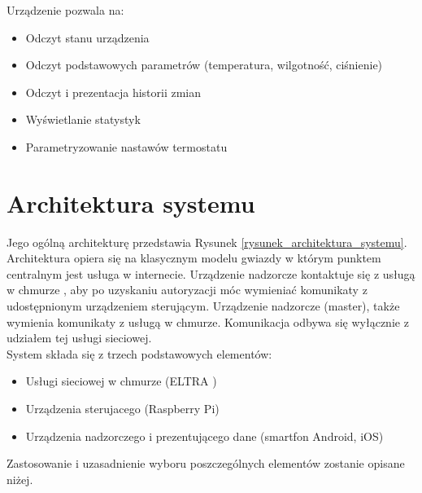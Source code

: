 \documentclass[a4paper,10pt]{article}
\begin{document}
Urządzenie pozwala na:

\begin{itemize}
    \item Odczyt stanu urządzenia
    \item Odczyt podstawowych parametrów (temperatura, wilgotność, ciśnienie)
    \item Odczyt i prezentacja historii zmian
    \item Wyświetlanie statystyk
    \item Parametryzowanie nastawów termostatu
\end{itemize}

\section{Architektura systemu}
\label{architektura_systemu}

Jego ogólną architekturę przedstawia Rysunek \ref{rysunek_architektura_systemu}. Architektura opiera się na klasycznym modelu gwiazdy w którym punktem centralnym jest usługa w internecie. Urządzenie nadzorcze kontaktuje się z usługą w chmurze \cite{CloudExplained}, aby po uzyskaniu autoryzacji móc wymieniać komunikaty z udostępnionym urządzeniem sterującym. Urządzenie nadzorcze (master), także wymienia komunikaty z usługą w chmurze. Komunikacja odbywa się wyłącznie z udziałem tej usługi sieciowej. \\

System składa się z trzech podstawowych elementów:

\begin{itemize}
    \item Usługi sieciowej w chmurze (ELTRA \cite{EltraWebsite})
    \item Urządzenia sterujacego (Raspberry Pi\cite{RaspberryPiWiki})
    \item Urządzenia nadzorczego i prezentującego dane (smartfon Android\cite{AndroidWiki}, iOS\cite{IOSWiki})
\end{itemize}

Zastosowanie i uzasadnienie wyboru poszczególnych elementów zostanie opisane niżej.
\end{document}

